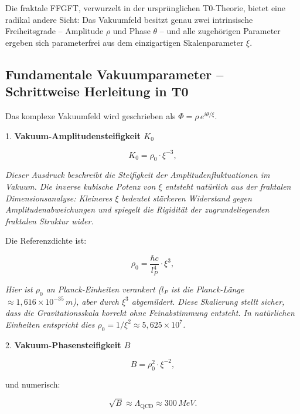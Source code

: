 	Die fraktale FFGFT, verwurzelt in der ursprünglichen T0-Theorie, bietet eine radikal andere Sicht: Das Vakuumfeld besitzt genau zwei intrinsische Freiheitsgrade – Amplitude \(\rho\) und Phase \(\theta\) – und alle zugehörigen Parameter ergeben sich parameterfrei aus dem einzigartigen Skalenparameter \(\xi\).
	
	\subsection*{Fundamentale Vakuumparameter – Schrittweise Herleitung in T0}
	
	Das komplexe Vakuumfeld wird geschrieben als \(\Phi = \rho\, e^{i \theta / \xi}\).
	
	1. \textbf{Vakuum-Amplitudensteifigkeit \(K_0\)}
	
	\begin{equation}
		K_0 = \rho_0 \cdot \xi^{-3},
	\end{equation}
	
	\textit{Dieser Ausdruck beschreibt die Steifigkeit der Amplitudenfluktuationen im Vakuum. Die inverse kubische Potenz von \(\xi\) entsteht natürlich aus der fraktalen Dimensionsanalyse: Kleineres \(\xi\) bedeutet stärkeren Widerstand gegen Amplitudenabweichungen und spiegelt die Rigidität der zugrundeliegenden fraktalen Struktur wider.}
	
	Die Referenzdichte ist:
	
	\begin{equation}
		\rho_0 = \frac{\hbar c}{l_P^4} \cdot \xi^3,
	\end{equation}
	
	\textit{Hier ist \(\rho_0\) an Planck-Einheiten verankert (\(l_P\) ist die Planck-Länge \(\approx 1{,}616 \times 10^{-35}\,\si{m}\)), aber durch \(\xi^3\) abgemildert. Diese Skalierung stellt sicher, dass die Gravitationsskala korrekt ohne Feinabstimmung entsteht. In natürlichen Einheiten entspricht dies \(\rho_0 = 1/\xi^2 \approx 5{,}625 \times 10^7\).}
	
	2. \textbf{Vakuum-Phasensteifigkeit \(B\)}
	
	\begin{equation}
		B = \rho_0^2 \cdot \xi^{-2},
	\end{equation}
	
	und numerisch:
	
	\begin{equation}
		\sqrt{B} \approx \Lambda_{\text{QCD}} \approx 300\,\si{MeV}.
	\end{equation}
	
